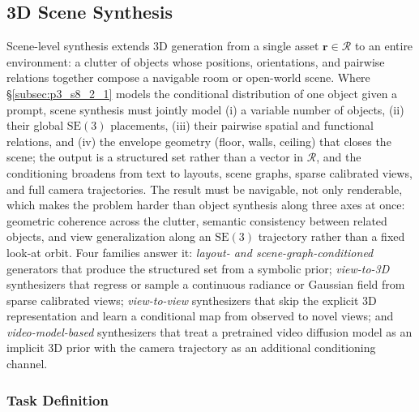 
\subsection{3D Scene Synthesis}
\label{subsec:p3_s8_2_2}


Scene-level synthesis extends 3D generation from a single asset $\mathbf{r}\!\in\!\mathcal{R}$ to an entire environment: a clutter of objects whose positions, orientations, and pairwise relations together compose a navigable room or open-world scene.
Where §\ref{subsec:p3_s8_2_1} models the conditional distribution of one object given a prompt, scene synthesis must jointly model (i) a variable number of objects, (ii) their global $\mathrm{SE}(3)$ placements, (iii) their pairwise spatial and functional relations, and (iv) the envelope geometry (floor, walls, ceiling) that closes the scene; the output is a structured set rather than a vector in $\mathcal{R}$, and the conditioning broadens from text to layouts, scene graphs, sparse calibrated views, and full camera trajectories.
The result must be navigable, not only renderable, which makes the problem harder than object synthesis along three axes at once: geometric coherence across the clutter, semantic consistency between related objects, and view generalization along an $\mathrm{SE}(3)$ trajectory rather than a fixed look-at orbit.
Four families answer it: \emph{layout- and scene-graph-conditioned} generators that produce the structured set from a symbolic prior; \emph{view-to-3D} synthesizers that regress or sample a continuous radiance or Gaussian field from sparse calibrated views; \emph{view-to-view} synthesizers that skip the explicit 3D representation and learn a conditional map from observed to novel views; and \emph{video-model-based} synthesizers that treat a pretrained video diffusion model as an implicit 3D prior with the camera trajectory as an additional conditioning channel.


\subsubsection{Task Definition}
\label{subsubsec:p3_s8_2_2_task}

